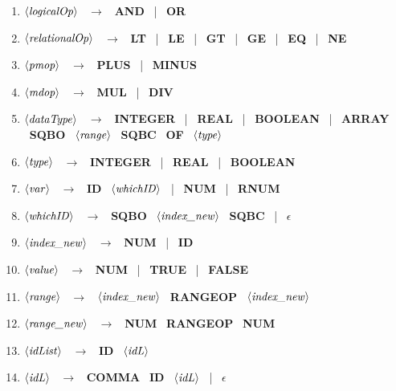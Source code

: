 \documentclass[a4paper]{article}
\newcommand{\nonTerm}[1]{$\left<\text{\textit{#1}}\right>$ \ }
\newcommand{\terminal}[1]{\textbf{\uppercase{#1}} \ }
\newcommand{\ra}[0]{$\rightarrow$ \ }
\newcommand{\eps}[0]{\terminal{$\epsilon$}}
\newcommand{\vertbar}[0]{| \ }
\newcommand{\dataType}[0]{\nonTerm{dataType}}
\newcommand{\type}[0]{\nonTerm{type}}
\newcommand{\range}[0]{\nonTerm{range}}
\newcommand{\var}[0]{\nonTerm{var}}
\newcommand{\whichID}[0]{\nonTerm{whichID}}
\newcommand{\logicalOp}[0]{\nonTerm{logicalOp}}
\newcommand{\relationalOp}[0]{\nonTerm{relationalOp}}
\newcommand{\pmop}[0]{\nonTerm{pmop}}
\newcommand{\mdop}[0]{\nonTerm{mdop}}
\newcommand{\indexNewTerm}[0]{\nonTerm{index\_new}}
\newcommand{\rangeNew}[0]{\nonTerm{range\_new}}
\newcommand{\idList}[0]{\nonTerm{idList}}
\newcommand{\idL}[0]{\nonTerm{idL}}
\newcommand{\valueTerm}[0]{\nonTerm{value}}
\newcommand{\id}[0]{\terminal{id}}
\newcommand{\num}[0]{\terminal{num}}
\newcommand{\rnum}[0]{\terminal{rnum}}
\newcommand{\integer}[0]{\terminal{integer}}
\newcommand{\real}[0]{\terminal{real}}
\newcommand{\boolean}[0]{\terminal{boolean}}
\newcommand{\of}[0]{\terminal{of}}
\newcommand{\arrayTerm}[0]{\terminal{array}}
\newcommand{\true}[0]{\terminal{true}}
\newcommand{\false}[0]{\terminal{false}}
\newcommand{\andTerm}[0]{\terminal{and}}
\newcommand{\orTerm}[0]{\terminal{or}}
\newcommand{\plus}[0]{\terminal{plus}}
\newcommand{\minus}[0]{\terminal{minus}}
\newcommand{\mul}[0]{\terminal{mul}}
\newcommand{\divTerm}[0]{\terminal{div}}
\newcommand{\lt}[0]{\terminal{lt}}
\newcommand{\leTerm}[0]{\terminal{le}}
\newcommand{\geTerm}[0]{\terminal{ge}}
\newcommand{\gt}[0]{\terminal{gt}}
\newcommand{\eqTerm}[0]{\terminal{eq}}
\newcommand{\neTerm}[0]{\terminal{ne}}
\newcommand{\rangeop}[0]{\terminal{rangeop}}
\newcommand{\comma}[0]{\terminal{comma}}
\newcommand{\sqbo}[0]{\terminal{sqbo}}
\newcommand{\sqbc}[0]{\terminal{sqbc}}
\begin{document}
\begin{enumerate}
    \item \logicalOp \ra \andTerm \vertbar \orTerm
    \item \relationalOp \ra \lt \vertbar \leTerm \vertbar \gt \vertbar \geTerm \vertbar \eqTerm \vertbar \neTerm
    \item \pmop \ra \plus \vertbar \minus
    \item \mdop \ra \mul \vertbar \divTerm
    \item \dataType \ra \integer \vertbar \real \vertbar \boolean \vertbar \arrayTerm \sqbo \range \sqbc \of \type
    \item \type \ra \integer \vertbar \real \vertbar \boolean
    \item \var \ra \id \whichID \vertbar \num \vertbar \rnum
    \item \whichID \ra \sqbo \indexNewTerm \sqbc \vertbar \eps
    \item \indexNewTerm \ra \num \vertbar \id
    \item \valueTerm \ra \num \vertbar \true \vertbar \false
    \item \range \ra \indexNewTerm \rangeop \indexNewTerm
    \item \rangeNew \ra \num \rangeop \num
    \item \idList \ra \id \idL
    \item \idL \ra \comma \id \idL \vertbar \eps
\end{enumerate}
\end{document}
